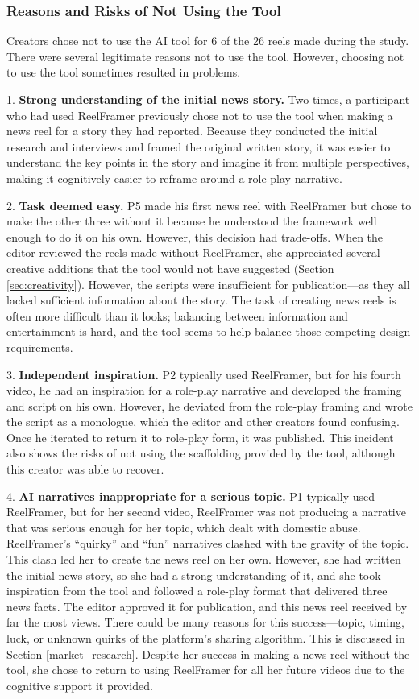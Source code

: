 \subsubsection{Reasons and Risks of Not Using the Tool}

Creators chose not to use the AI tool for 6 of the 26 reels made during the study. 
There were several legitimate reasons not to use the tool.
However, choosing not to use the tool sometimes resulted in problems.

1. \textbf{Strong understanding of the initial news story.} 
Two times, a participant who had used ReelFramer previously chose not to use the tool when making a news reel for a story they had reported. 
Because they conducted the initial research and interviews and framed the original written story, it was easier to understand the key points in the story and imagine it from multiple perspectives,  making it cognitively easier to reframe around a role-play narrative. 

2. \textbf{Task deemed easy.} P5 made his first news reel with ReelFramer but chose to make the other three without it because he understood the framework well enough to do it on his own. 
However, this decision had trade-offs. 
When the editor reviewed the reels made without ReelFramer, she appreciated several creative additions that the tool would not have suggested (Section \ref{sec:creativity}). 
However, the scripts were insufficient for publication---as they all lacked sufficient information about the story.
The task of creating news reels is often more difficult than it looks; balancing between information and entertainment is hard, and the tool seems to help balance those competing design requirements.

3. \textbf{Independent inspiration.} 
P2 typically used ReelFramer, but for his fourth video, he had an inspiration for a role-play narrative and developed the framing and script on his own. 
However, he deviated from the role-play framing and wrote the script as a monologue, which the editor and other creators found confusing.
Once he iterated to return it to role-play form, it was published.
This incident also shows the risks of not using the scaffolding provided by the tool, although this creator was able to recover.

4. \textbf{AI narratives inappropriate for a serious topic.}
P1 typically used ReelFramer, but for her second video, ReelFramer was not producing a narrative that was serious enough for her topic, which dealt with domestic abuse. 
ReelFramer's ``quirky'' and ``fun'' narratives clashed with the gravity of the topic. 
This clash led her to create the news reel on her own. 
However, she had written the initial news story, so she had a strong understanding of it, and she took inspiration from the tool and followed a role-play format that delivered three news facts. 
The editor approved it for publication, and this news reel received by far the most views. 
There could be many reasons for this success---topic, timing, luck, or unknown quirks of the platform's sharing algorithm. 
This is discussed in Section \ref{market_research}. 
Despite her success in making a news reel without the tool, she chose to return to using ReelFramer for all her future videos due to the cognitive support it provided.

